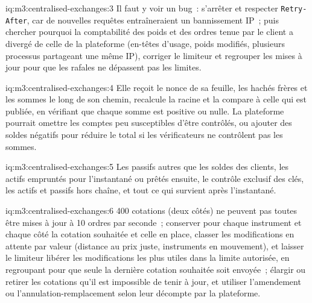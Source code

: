 \begin{solution}{iq:m3:centralised-exchanges:3}
Il faut y voir un bug~: s'arrêter et respecter \texttt{Retry-After}, car de nouvelles requêtes entraîneraient un bannissement IP~; puis
chercher pourquoi la comptabilité des poids et des ordres tenue par le client a divergé de celle de la plateforme (en-têtes d'usage, poids
modifiés, plusieurs processus partageant une même IP), corriger le limiteur et regrouper les mises à jour pour que les rafales ne
dépassent pas les limites.
\end{solution}

\begin{solution}{iq:m3:centralised-exchanges:4}
Elle reçoit le nonce de sa feuille, les hachés frères et les sommes le long de son chemin, recalcule la racine et la compare
à celle qui est publiée, en vérifiant que chaque somme est positive ou nulle. La plateforme pourrait omettre les comptes peu susceptibles
d'être contrôlés, ou ajouter des soldes négatifs pour réduire le total si les vérificateurs ne contrôlent pas les sommes.
\end{solution}

\begin{solution}{iq:m3:centralised-exchanges:5}
Les passifs autres que les soldes des clients, les actifs empruntés pour l'instantané ou prêtés ensuite, le contrôle exclusif
des clés, les actifs et passifs hors chaîne, et tout ce qui survient après l'instantané.
\end{solution}

\begin{solution}{iq:m3:centralised-exchanges:6}
400 cotations (deux côtés) ne peuvent pas toutes être mises à jour à 10 ordres par seconde~; conserver pour chaque instrument et chaque côté la cotation souhaitée et
celle en place, classer les modifications en attente par valeur (distance au prix juste, instruments en
mouvement), et laisser le limiteur libérer les modifications les plus utiles dans la limite autorisée, en regroupant pour que seule la
dernière cotation souhaitée soit envoyée~; élargir ou retirer les cotations qu'il est impossible de tenir à jour, et utiliser l'amendement ou l'annulation-remplacement
selon leur décompte par la plateforme.
\end{solution}
